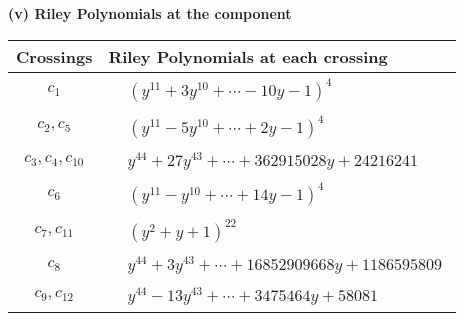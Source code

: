 \documentclass[1p]{elsarticle_modified}
\theoremstyle{definition}
\begin{document}
\newpage\renewcommand{\arraystretch}{1}
\flushleft \textbf{(v) Riley Polynomials at the component}\newline \\
\begin{tabular}{m{50pt}|m{274pt}}
Crossings & \hspace{64pt}Riley Polynomials at each crossing \\
\hline $$\begin{aligned}c_{1}\end{aligned}$$&$\begin{aligned}
&(y^{11}+3 y^{10}+\cdots-10 y-1)^{4}
\end{aligned}$\\
\hline $$\begin{aligned}c_{2},c_{5}\end{aligned}$$&$\begin{aligned}
&(y^{11}-5 y^{10}+\cdots+2 y-1)^{4}
\end{aligned}$\\
\hline $$\begin{aligned}c_{3},c_{4},c_{10}\end{aligned}$$&$\begin{aligned}
&y^{44}+27 y^{43}+\cdots+362915028 y+24216241
\end{aligned}$\\
\hline $$\begin{aligned}c_{6}\end{aligned}$$&$\begin{aligned}
&(y^{11}- y^{10}+\cdots+14 y-1)^{4}
\end{aligned}$\\
\hline $$\begin{aligned}c_{7},c_{11}\end{aligned}$$&$\begin{aligned}
&(y^2+y+1)^{22}
\end{aligned}$\\
\hline $$\begin{aligned}c_{8}\end{aligned}$$&$\begin{aligned}
&y^{44}+3 y^{43}+\cdots+16852909668 y+1186595809
\end{aligned}$\\
\hline $$\begin{aligned}c_{9},c_{12}\end{aligned}$$&$\begin{aligned}
&y^{44}-13 y^{43}+\cdots+3475464 y+58081
\end{aligned}$\\
\hline
\end{tabular}\\~\\
\end{document}
